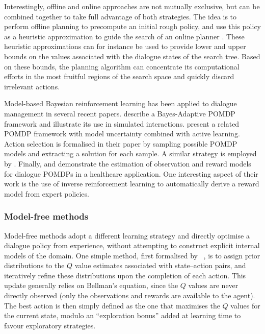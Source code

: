 Interestingly, offline and online approaches are not mutually exclusive, but can be combined together to take full advantage of both strategies.  The idea is to perform offline planning to precompute an initial rough policy, and use this policy as a heuristic approximation to guide the search of an online planner \citep{RossC07}. These heuristic approximations can for instance be used to provide lower and upper bounds on the values associated with the dialogue states of the search tree.  Based on these bounds, the planning algorithm can concentrate its computational efforts in the most fruitful regions of the search space and quickly discard irrelevant actions. 

Model-based Bayesian reinforcement learning has been applied to dialogue management in several recent papers.  \cite{DBLP:journals/jstsp/PngPC12} describe a Bayes-Adaptive POMDP framework and illustrate its use in simulated interactions. \cite{DoshiR08} present a related POMDP framework with model uncertainty combined with active learning.  Action selection is formalised in their paper by sampling possible POMDP models and extracting a solution for each sample. A similar strategy is employed by \cite{DBLP:conf/iui/AtrashP09}.  Finally, \cite{ChinaeiC12} and \cite{chinaei2012} demonstrate the estimation of observation and reward models for dialogue POMDPs in a healthcare application.  One interesting aspect of their work is the use of inverse reinforcement learning to automatically derive a reward model from expert policies.

\subsubsection*{Model-free methods}

Model-free methods adopt a different learning strategy and directly optimise a dialogue policy from experience, without attempting to construct explicit internal models of the domain. One simple method, first formalised by \ \cite{Dearden:1998}, is to assign prior distributions to the $Q$ value estimates associated with state--action pairs, and iteratively refine these distributions upon the completion of each action. This update generally relies on Bellman's equation, since the $Q$ values are never directly observed (only the observations and rewards are available to the agent). The best action is then simply defined as the one that maximises the $Q$ values for the current state, modulo an ``exploration bonus'' added at learning time to favour exploratory strategies.  

